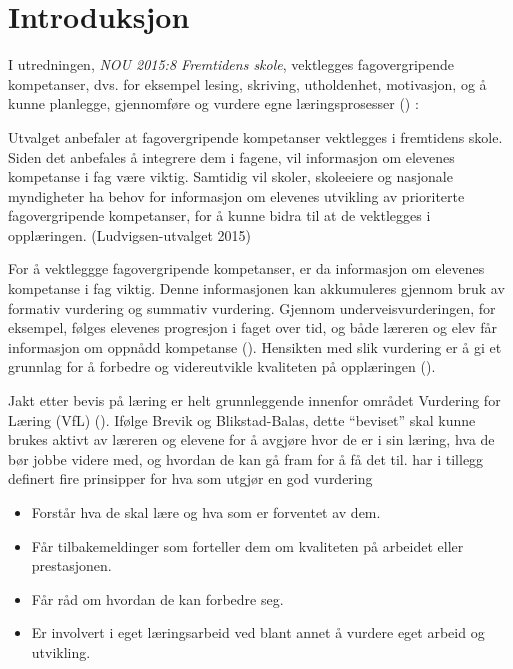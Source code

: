\documentclass[main.tex]{subfiles}
\begin{document}
\section*{Introduksjon}
I utredningen, \emph{NOU 2015:8 Fremtidens skole}, vektlegges fagovergripende kompetanser, dvs. 
for eksempel lesing, skriving, utholdenhet, motivasjon, og å kunne planlegge, 
gjennomføre og vurdere egne læringsprosesser () :
\begin{displayquote}
Utvalget anbefaler at fagovergripende kompetanser vektlegges i fremtidens skole. Siden det  
anbefales å integrere dem i fagene, vil informasjon om elevenes kompetanse i fag være viktig.  
Samtidig vil skoler, skoleeiere og nasjonale myndigheter ha behov for informasjon om elevenes utvikling av 
prioriterte fagovergripende kompetanser, for å kunne bidra til at de vektlegges i opplæringen. 
(Ludvigsen-utvalget 2015)
\end{displayquote}
For å vektleggge fagovergripende kompetanser, er da informasjon om elevenes kompetanse i fag viktig. 
Denne informasjonen kan akkumuleres gjennom bruk av formativ vurdering og summativ vurdering.
Gjennom underveisvurderingen, for eksempel, følges elevenes progresjon i faget over tid, og både læreren 
og elev får informasjon om oppnådd kompetanse (). Hensikten med slik vurdering er å 
gi et grunnlag for å forbedre og videreutvikle kvaliteten på opplæringen ().

Jakt etter bevis på læring er helt grunnleggende innenfor området Vurdering for Læring (VfL)
(). Ifølge Brevik og Blikstad-Balas, dette ``beviset'' skal kunne brukes aktivt
av læreren og elevene for å avgjøre hvor de er i sin læring, hva de bør jobbe videre med, og
hvordan de kan gå fram for å få det til.  har i tillegg definert fire
prinsipper for hva som utgjør en god vurdering 
\begin{itemize}
\item Forstår hva de skal lære og hva som er forventet av dem.
\item Får tilbakemeldinger som forteller dem om kvaliteten på arbeidet eller prestasjonen.
\item Får råd om hvordan de kan forbedre seg.
\item Er involvert i eget læringsarbeid ved blant annet å vurdere eget arbeid og utvikling.
\end{itemize}
\end{document}
